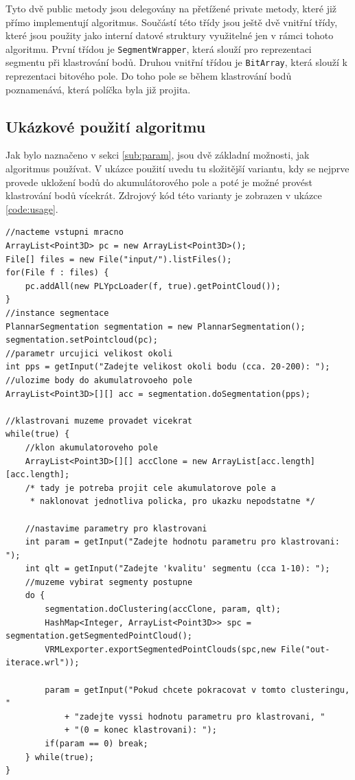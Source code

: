 \documentclass[11pt,twoside,a4paper]{book}
\begin{document}
Tyto dvě public metody jsou delegovány na přetížené private metody, které již přímo implementují algoritmus. Součástí této třídy jsou ještě dvě vnitřní třídy, které jsou použity jako interní datové struktury využitelné jen v rámci tohoto algoritmu. První třídou je \verb|SegmentWrapper|, která slouží pro reprezentaci segmentu při klastrování bodů. Druhou vnitřní třídou je \verb|BitArray|, která slouží k reprezentaci bitového pole. Do toho pole se během klastrování bodů poznamenává, která políčka byla již projita. 

\subsection{Ukázkové použití algoritmu}
\label{sub:pouziti}

Jak bylo naznačeno v sekci \ref{sub:param}, jsou dvě základní možnosti, jak algoritmus používat. V ukázce použití uvedu tu složitější variantu, kdy se nejprve provede ukložení bodů do akumulátorového pole a poté je možné provést klastrování bodů vícekrát. Zdrojový kód této varianty je zobrazen v ukázce \ref{code:usage}. 

\begin{lstlisting}[label={code:usage},caption={Ukázkové použití implementace algoritmu.}]
//nacteme vstupni mracno
ArrayList<Point3D> pc = new ArrayList<Point3D>();
File[] files = new File("input/").listFiles();
for(File f : files) {
    pc.addAll(new PLYpcLoader(f, true).getPointCloud());
}
//instance segmentace
PlannarSegmentation segmentation = new PlannarSegmentation();
segmentation.setPointcloud(pc);
//parametr urcujici velikost okoli
int pps = getInput("Zadejte velikost okoli bodu (cca. 20-200): ");
//ulozime body do akumulatrovoeho pole
ArrayList<Point3D>[][] acc = segmentation.doSegmentation(pps);

//klastrovani muzeme provadet vicekrat
while(true) {
	//klon akumulatoroveho pole
	ArrayList<Point3D>[][] accClone = new ArrayList[acc.length][acc.length];
	/* tady je potreba projit cele akumulatorove pole a 
	 * naklonovat jednotliva policka, pro ukazku nepodstatne */
	
	//nastavime parametry pro klastrovani
	int param = getInput("Zadejte hodnotu parametru pro klastrovani: ");
	int qlt = getInput("Zadejte 'kvalitu' segmentu (cca 1-10): ");  
	//muzeme vybirat segmenty postupne 
	do {
		segmentation.doClustering(accClone, param, qlt);
		HashMap<Integer, ArrayList<Point3D>> spc = segmentation.getSegmentedPointCloud();
		VRMLexporter.exportSegmentedPointClouds(spc,new File("out-iterace.wrl"));

		param = getInput("Pokud chcete pokracovat v tomto clusteringu, "
			+ "zadejte vyssi hodnotu parametru pro klastrovani, "
			+ "(0 = konec klastrovani): ");
		if(param == 0) break;
	} while(true);
}
\end{lstlisting}
\end{document}
